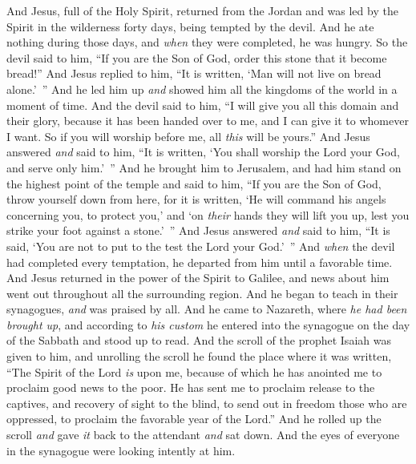 \begin{biblechapter} %
 And Jesus, full of the Holy Spirit, returned from the Jordan and was led by the Spirit in the wilderness
\verse forty days, being tempted by the devil. And he ate nothing during those days, and \textit{when} they were completed, he was hungry.
\verse So the devil said to him, “If you are the Son of God, order this stone that it become bread!”
\verse And Jesus replied to him, “It is written, ‘Man will not live on bread alone.’ ”
\verse And he led him up \textit{and} showed him all the kingdoms of the world in a moment of time.
\verse And the devil said to him, “I will give you all this domain and their glory, because it has been handed over to me, and I can give it to whomever I want.
\verse So if you will worship before me, all \textit{this} will be yours.”
\verse And Jesus answered \textit{and} said to him, “It is written, ‘You shall worship the Lord your God, and serve only him.’ ”
\verse And he brought him to Jerusalem, and had him stand on the highest point of the temple and said to him, “If you are the Son of God, throw yourself down from here,
\verse for it is written, ‘He will command his angels concerning you, 
to protect you,’
\verse and ‘on \textit{their} hands they will lift you up, 
lest you strike your foot against a stone.’ ”
\verse And Jesus answered \textit{and} said to him, “It is said, ‘You are not to put to the test the Lord your God.’ ”
\verse And \textit{when} the devil had completed every temptation, he departed from him until a favorable time.
 And Jesus returned in the power of the Spirit to Galilee, and news about him went out throughout all the surrounding region.
\verse And he began to teach in their synagogues, \textit{and} was praised by all.
 And he came to Nazareth, where \textit{he had been brought up}, and according to \textit{his custom} he entered into the synagogue on the day of the Sabbath and stood up to read.
\verse And the scroll of the prophet Isaiah was given to him, and unrolling the scroll he found the place where it was written,
\verse “The Spirit of the Lord \textit{is} upon me, 
because of which he has anointed me 
to proclaim good news to the poor. 
He has sent me 
to proclaim release to the captives, 
and recovery of sight to the blind, 
to send out in freedom those who are oppressed,
\verse to proclaim the favorable year of the Lord.”
\verse And he rolled up the scroll \textit{and} gave \textit{it} back to the attendant \textit{and} sat down. And the eyes of everyone in the synagogue were looking intently at him.

\end{biblechapter}
